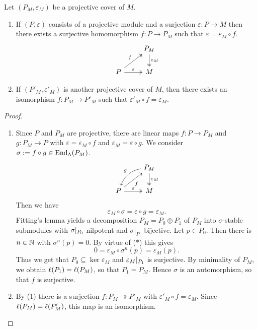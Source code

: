 
\begin{lemma}\label{2.2.1}
Let $(P_M,\varepsilon_M)$ be a projective cover of $M$.
\begin{enumerate}
\item If $(P,\varepsilon)$ consists of a projective module %
  and a surjection $\varepsilon: P \to M$ then there exists a surjective homomorphism
  $f: P \to P_M$ such that $\varepsilon = \varepsilon_M \circ f$.
\[
\begin{tikzcd}
& P_M \ar[d,"\varepsilon_M",two heads] \\
P \ar[ru,"f",two heads] \ar[r,"\varepsilon",two heads] & M 
\end{tikzcd}
\]
\item If $(P'_M, \varepsilon'_M)$ is another projective cover of $M$, then there exists
  an isomorphism $f:P_M \to P'_M$ such that $\varepsilon'_M \circ f = \varepsilon_M$.
\end{enumerate} 
\end{lemma}


\begin{proof}\
\begin{enumerate}
\item Since $P$ and $P_M$ are projective, there are linear maps $f: P
        \to P_M$ and $g: P_M \to P$ with $\varepsilon=\varepsilon_M\circ f$ and $\varepsilon_M=\varepsilon\circ g$.
        We consider $\sigma := f\circ g \in \operatorname{End}_\Lambda(P_M)$.
\[
\begin{tikzcd}
& P_M \ar[d,"\varepsilon_M",two heads] \ar[dl,"g"',bend right] \\
P \ar[ru,"f"'] \ar[r,"\varepsilon",two heads] & M 
\end{tikzcd}
\]        
        Then we have
        \[ \varepsilon_M \circ \sigma = \varepsilon \circ g = \varepsilon_M. \tag{$*$} \]
        Fitting's lemma yields a decomposition $P_M = P_0 \oplus P_1$
        of $P_M$ into $\sigma$-stable submodules with ${\sigma}|_{P_0}$ nilpotent and
        $\sigma|_{P_1}$ bijective.
        Let $p \in P_0$. Then there is $ n\in \mathbb{N}$ with $\sigma^n(p) = 0$. By virtue of
        ($*$) this gives \[0 = \varepsilon_M \circ \sigma^n(p) = \varepsilon_M(p).\] Thus we get that $P_0 \subseteq  \ker \varepsilon_M$ and
        ${\varepsilon_M}|_{P_1}$ is surjective.
        By minimality of $P_M$, we obtain $\ell(P_1) = \ell(P_M)$, so that
        $P_1 = P_M$. Hence $\sigma$ is an automorphism, so that $f$ is surjective.
\item By (1) there is a surjection
        $f : P_M \twoheadrightarrow P'_M$ with $\varepsilon'_M\circ f = \varepsilon_M$. Since $\ell(P_M) =
        \ell(P'_M)$, this map is an isomorphism.\qedhere
\end{enumerate}
\end{proof}

